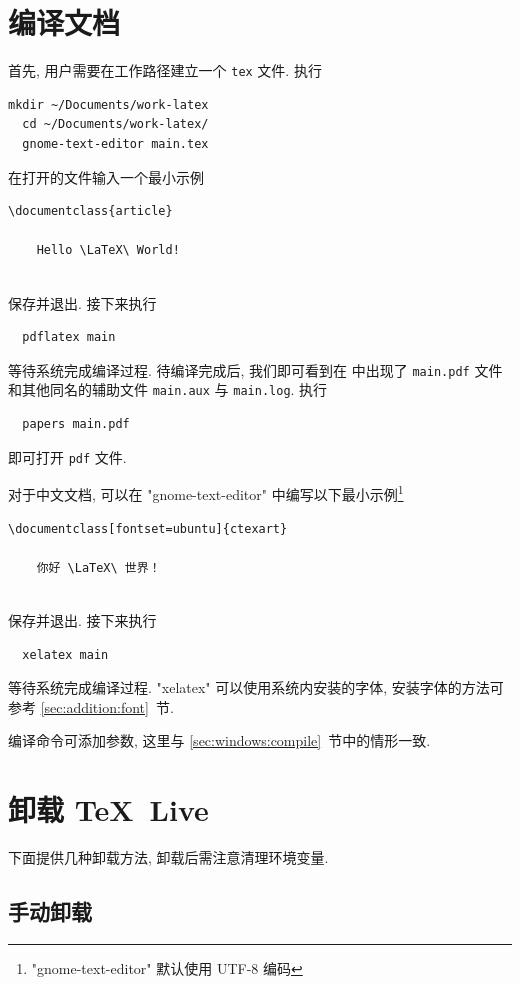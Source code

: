 \section{编译文档}

首先,
用户需要在工作路径建立一个 \texttt{tex} 文件.
执行
\begin{lstlisting}[deletekeywords = tex]
  mkdir ~/Documents/work-latex
  cd ~/Documents/work-latex/
  gnome-text-editor main.tex
\end{lstlisting}
在打开的文件输入一个最小示例
\begin{lstlisting}[language = mwe]
  \documentclass{article}
  
    Hello \LaTeX\ World!
  
\end{lstlisting}
保存并退出.
接下来执行
\begin{lstlisting}
  pdflatex main
\end{lstlisting}
等待系统完成编译过程.
待编译完成后,
我们即可看到在  中出现了
\texttt{main.pdf} 文件和其他同名的辅助文件 \texttt{main.aux} 与
\texttt{main.log}.
执行
\begin{lstlisting}
  papers main.pdf
\end{lstlisting}
即可打开 \texttt{pdf} 文件.

对于中文文档, 可以在 "gnome-text-editor" 中编写以下最小示例\footnote{"gnome-text-editor" 默认使用 UTF-8 编码}%
\begin{lstlisting}[language = mwe]
  \documentclass[fontset=ubuntu]{ctexart}
  
    你好 \LaTeX\ 世界！
  
\end{lstlisting}
保存并退出.
接下来执行
\begin{lstlisting}
  xelatex main
\end{lstlisting}
等待系统完成编译过程.
"xelatex" 可以使用系统内安装的字体,
安装字体的方法可参考 \ref{sec:addition:font}~节.

编译命令可添加参数, 这里与 \ref{sec:windows:compile}~节中的情形一致.

\section{卸载 \TeX~Live}\label{sec:ubuntu:uninstall}

下面提供几种卸载方法,
卸载后需注意清理环境变量.

\subsection{手动卸载}

